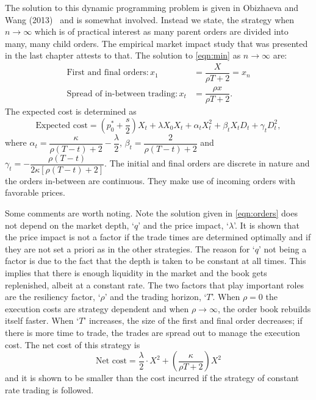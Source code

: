 The solution to this dynamic programming problem is given in Obizhaeva and Wang (2013)~\cite[p.14, Proposition 1]{obizhaeva} and is somewhat involved. Instead we state, the strategy when $n \to \infty$ which is of practical interest as many parent orders are divided into many, many child orders. The empirical market impact study that was presented in the last chapter attests to that. The solution to \eqref{eqn:min} as $n \to \infty$ are:
	\begin{equation} \label{eqn:orders}
	\begin{split}
	\text{First and final orders}: x_1&= \dfrac{X}{\rho T+2} = x_n  \\
	\text{Spread of in-between trading}: x_t&= \dfrac{\rho x}{\rho T+2}.
	\end{split}
	\end{equation}
The expected cost is determined as
	\begin{equation} \label{eqn:expected}
	\text{Expected cost}= \left( p_0^* + \dfrac{s}{2} \right) X_t + \lambda X_0 X_t + \alpha_t X_t^2 + \beta_t X_t D_t + \gamma_t D_t^2,
	\end{equation}
where $\alpha_t= \dfrac{\kappa}{\rho(T-t)+2} - \dfrac{\lambda}{2}$, $\beta_t= \dfrac{2}{\rho(T-t) + 2}$ and $\gamma_t= - \dfrac{\rho(T-t)}{2 \kappa[\rho(T-t) + 2]}$. The initial and final orders are discrete in nature and the orders in-between are continuous. They make use of incoming orders with favorable prices. 


Some comments are worth noting. Note the solution given in \eqref{eqn:orders} does not depend on the market depth, `$q$' and the price impact, `$\lambda$'. It is shown that the price impact is not a factor if the trade times are determined optimally and if they are not set a priori as in the other strategies. The reason for `$q$' not being a factor is due to the fact that the depth is taken to be constant at all times. This implies that there is enough liquidity in the market and the book gets replenished, albeit at a constant rate. The two factors that play important roles are the resiliency factor, `$\rho$' and the trading horizon, `$T$'. When $\rho=0$ the execution costs are strategy dependent and when $\rho \to \infty$, the order book rebuilds itself faster. When `$T$' increases, the size of the first and final order decreases; if there is more time to trade, the trades are spread out to manage the execution cost. The net cost of this strategy is
	\begin{equation}\label{eqn:netcost}
	\text{Net cost}=\dfrac{\lambda}{2} \cdot X^2 + \left(\dfrac{\kappa}{\rho T+2} \right) X^2
	\end{equation}
and it is shown to be smaller than the cost incurred if the strategy of constant rate trading is followed. 


